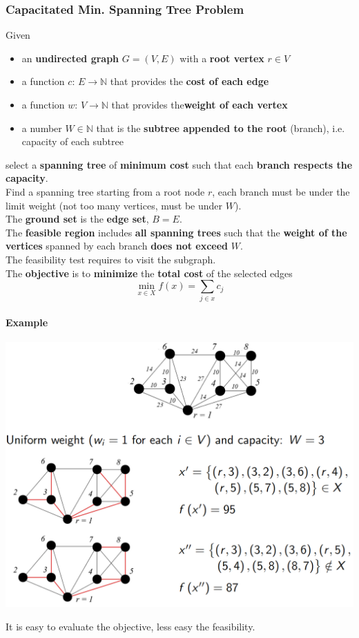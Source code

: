 \documentclass[11pt]{article}
\begin{document}
	\newpage
	
	\subsubsection{Capacitated Min. Spanning Tree Problem}
	Given
	\begin{itemize}
		\item an \textbf{undirected graph} $G = (V , E )$ with a \textbf{root vertex} $r \in V$
		\item a function $c : \, E \rightarrow \mathbb{N}$ that provides the \textbf{cost of each edge}
		\item a function $w : \, V \rightarrow \mathbb{N}$ that provides the\textbf{weight of each vertex}
		\item a number $W \in \mathbb{N}$ that is the \textbf{subtree appended to the root} (branch), i.e. capacity of each subtree
	\end{itemize}
	select a \textbf{spanning tree} of \textbf{minimum cost} such that each \textbf{branch respects the capacity}.\\
	Find a spanning tree starting from a root node $r$, each branch must be under the limit weight (not too many vertices, must be under $W$).\\
	
	The \textbf{ground set} is the \textbf{edge set}, $B = E$.\\
	
	The \textbf{feasible region} includes \textbf{all spanning trees} such that the \textbf{weight of the vertices} spanned by each branch \textbf{does not exceed} $W$.\\
	The feasibility test requires to visit the subgraph.\\
	
	The \textbf{objective} is to \textbf{minimize} the \textbf{total cost} of the selected edges
	$$ \min_{x \in X} f(x) = \sum_{j \in x} c_j $$
	
	\newpage
	
	\paragraph{Example}
	\begin{center}
		\includegraphics[width=0.8\columnwidth]{img/CSTP}
	\end{center}
	It is easy to evaluate the objective, less easy the feasibility.
	
\end{document}
